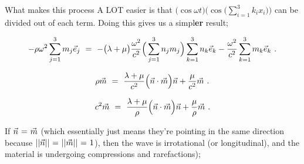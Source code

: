 \documentclass{article}
\begin{document}
What makes this process A LOT easier is that \begin{math}  \big( \cos{ \omega t } \big) \Big( \cos \Big( \sum_{i = 1}^{3} k_i x_i \Big) \Big) \end{math} can be divided out of each term. Doing this gives us a simpl\textbf{er} result;

\begin{equation} \label{eb-eq-1-172}
 - \rho \omega{}^2 \sum_{j = 1}^{3} m_j \vec{e}_j \hspace{0.125cm} = \hspace{0.125cm} - \big( \lambda + \mu \big) \frac{\omega{}^2}{c^2} \Big( \sum_{j = 1}^{3} n_j m_j \Big) \sum_{k = 1}^{3} n_k \vec{e}_k - \frac{\omega{}^2}{c^2} \sum_{k = 1}^{3} m_k \vec{e}_k \hspace{0.125cm}  .
\end{equation}

\begin{equation} \label{eb-eq-1-173}
\rho \vec{m} \hspace{0.125cm} = \hspace{0.125cm} \frac{\lambda + \mu}{c^2} \Big( \vec{n} \cdot \vec{m} \Big) \vec{n} + \frac{\mu}{c^2} \vec{m} \hspace{0.125cm}  .
\end{equation}

\begin{equation} \label{eb-eq-1-174}
c^2 \vec{m} \hspace{0.125cm} = \hspace{0.125cm} \frac{\lambda + \mu}{\rho} \Big( \vec{n} \cdot \vec{m} \Big) \vec{n} + \frac{\mu}{\rho} \vec{m} \hspace{0.125cm}  .
\end{equation}

If \begin{math} \vec{n} \hspace{0.025cm} = \hspace{0.025cm} \vec{m} \end{math} (which essentially just means they're pointing in the same direction because  \begin{math} | | \vec{n} | | \hspace{0.025cm} = \hspace{0.025cm} | | \vec{m} | | \hspace{0.025cm} = \hspace{0.025cm} 1 \end{math}), then the wave is irrotational (or longitudinal), and the material is undergoing compressions and rarefactions);
\end{document}
